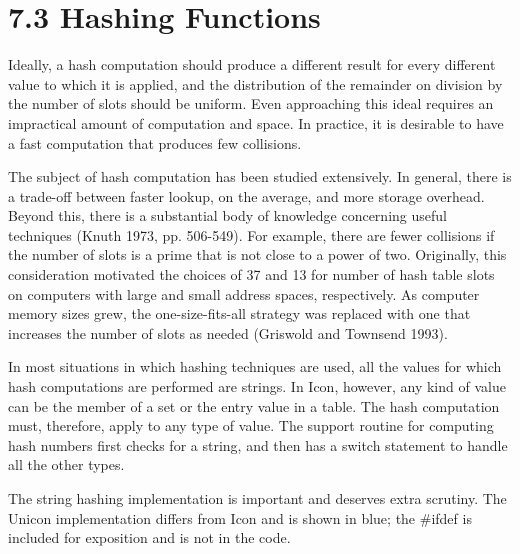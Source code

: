 \section[7.3 Hashing Functions]{7.3 Hashing Functions}

Ideally, a hash computation should produce a different result for
every different value to which it is applied, and the distribution of
the remainder on division by the number of slots should be
uniform. Even approaching this ideal requires an impractical amount of
computation and space. In practice, it is desirable to have a fast
computation that produces few collisions.

The subject of hash computation has been studied extensively.  In
general, there is a trade-off between faster lookup, on the average,
and more storage overhead. Beyond this, there is a substantial body of
knowledge concerning useful techniques (Knuth 1973, pp. 506-549). For
example, there are fewer collisions if the number of slots is a prime
that is not close to a power of two. Originally, this consideration
motivated the choices of 37 and 13 for number of hash table slots on
computers with large and small address spaces, respectively. As
computer memory sizes grew, the one-size-fits-all strategy was
replaced with one that increases the number of slots as needed
(Griswold and Townsend 1993).

In most situations in which hashing techniques are used, all the
values for which hash computations are performed are strings. In Icon,
however, any kind of value can be the member of a set or the entry
value in a table. The hash computation must, therefore, apply to any
type of value. The support routine for computing hash numbers first
checks for a string, and then has a switch statement to handle all
the other types.

The string hashing implementation is important and deserves extra
scrutiny. The Unicon implementation differs from Icon and is shown
in blue; the \#ifdef is included for exposition and is not in the code.

